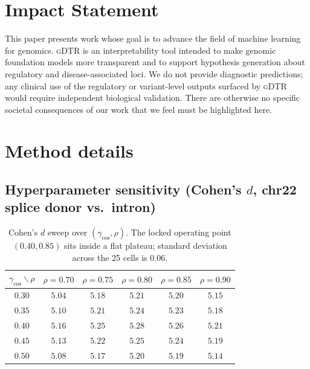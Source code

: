 \documentclass{article}
\theoremstyle{plain}
\theoremstyle{definition}
\theoremstyle{remark}
\newcommand{\gDTR}{\textsc{gDTR}}
\begin{document}
\section*{Impact Statement}
This paper presents work whose goal is to advance the field of
machine learning for genomics. \gDTR{} is an interpretability tool
intended to make genomic foundation models more transparent and to
support hypothesis generation about regulatory and disease-associated
loci. We do not provide diagnostic predictions; any clinical use of
the regulatory or variant-level outputs surfaced by \gDTR{} would
require independent biological validation. There are otherwise no
specific societal consequences of our work that we feel must be
highlighted here.




\newpage
\appendix
\onecolumn

\section{Method details}
\label{app:method}

\subsection{Hyperparameter sensitivity (Cohen's $d$, chr22 splice donor vs.\ intron)}
\label{app:gamma-sweep}

\begin{table}[h]
\caption{Cohen's $d$ sweep over $(\gamma_{\cos}, \rho)$. The locked
operating point $(0.40, 0.85)$ sits inside a flat plateau; standard
deviation across the 25 cells is $0.06$.}
\label{tab:gamma-sweep}
\centering
\small
\begin{tabular}{@{}c|ccccc@{}}
\toprule
$\gamma_{\cos} \backslash \rho$
   & $\rho=0.70$ & $\rho=0.75$ & $\rho=0.80$ & $\rho=0.85$ & $\rho=0.90$ \\
\midrule
$0.30$ & $5.04$ & $5.18$ & $5.21$ & $5.20$ & $5.15$ \\
$0.35$ & $5.10$ & $5.21$ & $5.24$ & $5.23$ & $5.18$ \\
$0.40$ & $5.16$ & $5.25$ & $\mathbf{5.28}$ & $\mathbf{5.26}$ & $5.21$ \\
$0.45$ & $5.13$ & $5.22$ & $5.25$ & $5.24$ & $5.19$ \\
$0.50$ & $5.08$ & $5.17$ & $5.20$ & $5.19$ & $5.14$ \\
\bottomrule
\end{tabular}
\end{table}
\end{document}
